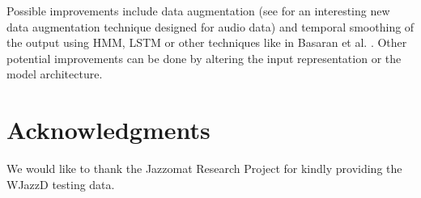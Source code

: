 \documentclass{article}
\begin{document}
Possible improvements include data augmentation (see \cite{Park_2019} for an interesting new data augmentation technique designed for audio data) and temporal smoothing of the output using HMM, LSTM or other techniques like in Basaran et al. \cite{DBasaranSEssid2018}. Other potential improvements can be done by altering the input representation or the model architecture. 

\section{Acknowledgments}
We would like to thank the Jazzomat Research Project for kindly providing the WJazzD testing data.



\end{document}
